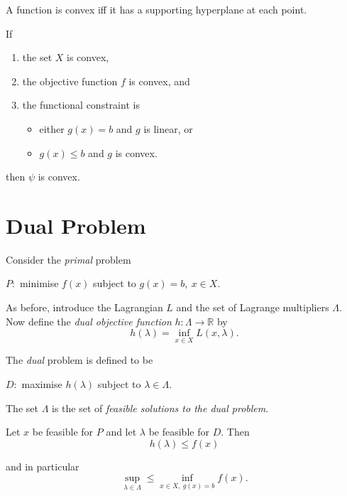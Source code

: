 \documentclass[a4paper]{article}
\begin{document}
\begin{theorem}
  A function is convex iff it has a supporting hyperplane at each point.
\end{theorem}

\begin{proposition}
  If
  \begin{enumerate}
  \item the set $X$ is convex,
  \item the objective function $f$ is convex, and
  \item the functional constraint is
    \begin{itemize}
    \item either $g(x) = b$ and $g$ is linear, or
    \item $g(x) \leq b$ and $g$ is convex.
    \end{itemize}
  \end{enumerate}

  then $\psi$ is convex.
\end{proposition}

\section{Dual Problem}

Consider the \emph{primal} problem

\begin{center}
  $P:$ minimise $f(x)$ subject to $g(x) = b,\: x \in X$.
\end{center}

As before, introduce the Lagrangian $L$ and the set of Lagrange multipliers $\Lambda$. Now define the \emph{dual objective function} $h: \Lambda \rightarrow \mathbb{R}$ by
\[
  h(\lambda) = \inf_{x \in X} L(x, \lambda).
\]

The \emph{dual} problem is defined to be

\begin{center}
  $D:$ maximise $h(\lambda)$ subject to $\lambda \in \Lambda$.
\end{center}

The set $\Lambda$ is the set of \emph{feasible solutions to the dual problem}.

\begin{theorem}
  Let $x$ be feasible for $P$ and let $\lambda$ be feasible for $D$. Then
  \[
    h(\lambda) \leq f(x)
  \]

  and in particular
  \[
    \sup_{\lambda \in \Lambda} \leq \inf_{x \in X,\: g(x) = b} f(x).
  \]
\end{theorem}
\end{document}
